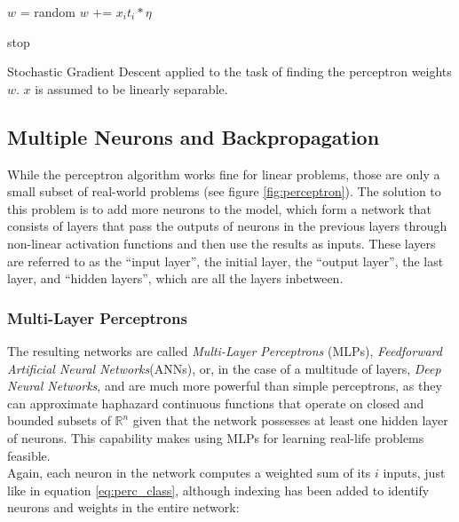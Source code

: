 \begin {algorithm}
	\begin {algorithmic}[1]
		\State $w$ = random
					\State $w$ += $x_i t_i * \eta$
				\EndIf

					\State stop
				\EndIf
			\EndFor
		\EndWhile
	\end{algorithmic}
	\caption{Stochastic Gradient Descent applied to the task of finding the perceptron weights $w$. $x$ is assumed to be linearly separable.}
	\label{alg:perceptron_algorithm}
\end{algorithm}



		\subsection{Multiple Neurons and Backpropagation}
\label{subsec:mlp_backprop}
While the perceptron algorithm works fine for linear problems, those are only a small subset of real-world problems (see figure \ref{fig:perceptron}). The solution to this problem is to add more neurons to the model, which form a network that consists of layers that pass the outputs of neurons in the previous layers through non-linear activation functions and then use the results as inputs. These layers are referred to as the ``input layer'', the initial layer, the ``output layer'', the last layer, and ``hidden layers'', which are all the layers inbetween.

	\subsubsection{Multi-Layer Perceptrons}
The resulting networks are called \textit{Multi-Layer Perceptrons} (MLPs), \textit{Feedforward Artificial Neural Networks}(ANNs), or, in the case of a multitude of layers, \textit{Deep Neural Networks}, and are much more powerful than simple perceptrons, as they can approximate haphazard continuous functions that operate on closed and bounded subsets of $\mathbb{R}^n$ given that the network possesses at least one hidden layer of neurons. This capability makes using MLPs for learning real-life problems feasible.\cite{universal_approx}\cite{universal_approx2}\\

\noindent Again, each neuron in the network computes a weighted sum of its $i$ inputs, just like in equation \ref{eq:perc_class}, although indexing has been added to identify neurons and weights in the entire network:

